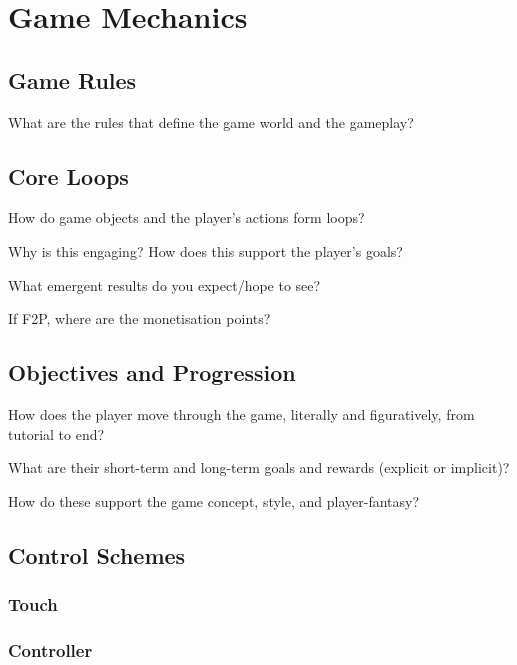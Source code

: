 \documentclass{scrartcl}
\begin{document}
\section{
  Game Mechanics
 }

\subsection{Game Rules}

What are the rules that define the game world and the gameplay?

\subsection{Core Loops}

How do game objects and the player’s actions form loops?

Why is this engaging? How does this support the player’s goals?

What emergent results do you expect/hope to see?

If F2P, where are the monetisation points?

\subsection{Objectives and Progression}

How does the player move through the game, literally and figuratively, from tutorial to end?

What are their short-term and long-term goals and rewards (explicit or implicit)?

How do these support the game concept, style, and player-fantasy?

\subsection{Control Schemes}

\subsubsection{Touch}

\subsubsection{Controller}

\printbibliography
\end{document}
